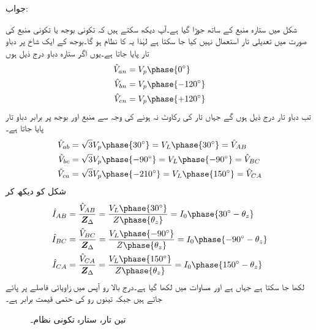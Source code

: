 جواب:

شکل  میں ستارہ منبع کے ساتھ  جوڑا گیا ہے۔آپ دیکھ سکتے ہیں کہ تکونی بوجھ یا تکونی منبع کی صورت میں تعدیلی تار استعمال نہیں کیا جا سکتا ہے لہٰذا یہ  کا نظام ہو گا۔بوجھ کے ایک شاخ پر دباو تار پایا جاتا ہے۔یوں اگر ستارہ دباو درج ذیل ہوں
\begin{align*}
\hat{V}_{an}&=V_p\phase{0^{\circ}}\\
\hat{V}_{bn}&=V_p\phase{-120^{\circ}}\\
\hat{V}_{cn}&=V_p\phase{+120^{\circ}}
\end{align*}
تب دباو تار درج ذیل ہوں گے جہاں تار کی رکاوٹ نہ ہونے کی وجہ سے منبع اور بوجھ پر برابر دباو تار پایا جاتا ہے۔
\begin{align*}
\hat{V}_{ab}&=\sqrt{3}V_p\phase{30^{\circ}}=V_L\phase{30^{\circ}}=\hat{V}_{AB}\\
\hat{V}_{bc}&=\sqrt{3}V_p\phase{-90^{\circ}}=V_L\phase{-90^{\circ}}=\hat{V}_{BC}\\
\hat{V}_{ca}&=\sqrt{3}V_p\phase{-210^{\circ}}=V_L\phase{150^{\circ}}=\hat{V}_{CA}
\end{align*}
شکل  کو دیکھ کر 
\begin{align*}
\hat{I}_{AB}&=\frac{\hat{V}_{AB}}{\bZ_{\Delta}}=\frac{V_L\phase{30^{\circ}}}{Z\phase{\theta_z}}=I_0\phase{30^{\circ}-\theta_z}\\
\hat{I}_{BC}&=\frac{\hat{V}_{BC}}{\bZ_{\Delta}}=\frac{V_L\phase{-90^{\circ}}}{Z\phase{\theta_z}}=I_0\phase{-90^{\circ}-\theta_z}\\
\hat{I}_{CA}&=\frac{\hat{V}_{CA}}{\bZ_{\Delta}}=\frac{V_L\phase{150^{\circ}}}{Z\phase{\theta_z}}=I_0\phase{150^{\circ}-\theta_z}
\end{align*}
لکھا جا سکتا ہے جہاں  ہے اور مساوات میں  لکھا گیا ہے۔درج بالا رو آپس میں  زاویائی فاصلے پر پائے جاتے ہیں جبکہ تینوں رو کی حتمی قیمت برابر ہے۔
\begin{figure}
\centering
{}
\caption{تین تار، ستارہ تکونی نظام۔}
\label{شکل_تین_دوری_ستارہ_تکونی_الف}
\end{figure}
